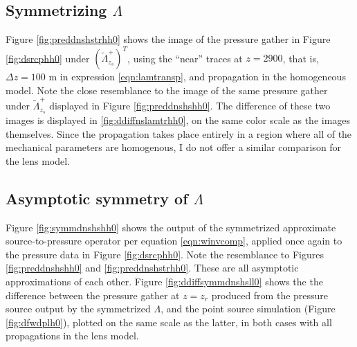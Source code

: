 \documentclass[georeport,12pt]{geophysics}
\begin{document}
\subsection{Symmetrizing $\Lambda$}

Figure \ref{fig:preddnshstrhh0} shows the image of the pressure gather
in Figure \ref{fig:dsrcphh0} under $(\tilde{\Lambda}^+_{z_s})^T$,
using the ``near'' traces at $z=2900$, that is, $\Delta z = 100$ m in
expression \ref{eqn:lamtransp}, and propagation in the
homogeneous model. Note
the close resemblance to the image of the same pressure gather under
$\tilde{\Lambda}^+_{z_s}$ displayed in Figure
\ref{fig:preddnshshh0}. The difference of these two images is
displayed in \ref{fig:ddiffnslamtrhh0}, on the same color scale as the
images themselves. Since the propagation takes place entirely in a
region where all of the mechanical parameters are homogenous, I do not
offer a similar comparison for the lens model.



\subsection{Asymptotic symmetry of $\Lambda$}

Figure \ref{fig:symmdnshshh0} shows the output of the symmetrized
approximate source-to-pressure operator per equation \ref{eqn:winvcomp},
applied once again to the pressure data in Figure
\ref{fig:dsrcphh0}. Note the resemblance to Figures
\ref{fig:preddnshshh0} and \ref{fig:preddnshstrhh0}. These are all
asymptotic approximations of each other. Figure
\ref{fig:ddiffsymmdnshsll0} shows the
 the difference between the pressure gather at $z=z_r$ produced from
 the pressure source output by the symmetrized $\Lambda$, and the point source
simulation (Figure \ref{fig:dfwdplh0}), plotted on the same scale as
the latter, in both cases with all propagations in the lens model.
\end{document}
